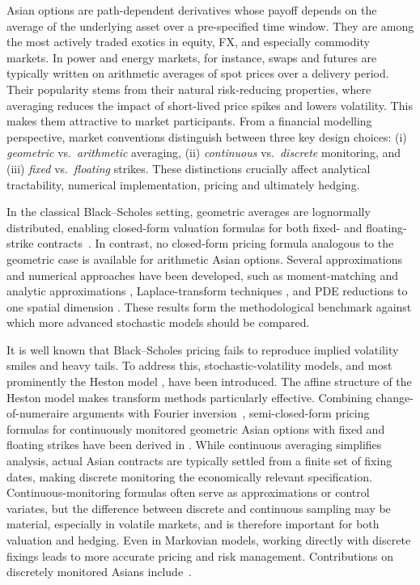 \documentclass[10pt,a4paper,reqno]{amsart}
\theoremstyle{plain}
\theoremstyle{definition}
\theoremstyle{remark}
\theoremstyle{example}
\begin{document}
Asian options are path-dependent derivatives whose payoff depends on the average of the underlying asset over a pre-specified time window. They are among the most actively traded exotics in equity, FX, and especially commodity markets. In power and energy markets, for instance, swaps and futures are typically written on arithmetic averages of spot prices over a delivery period. Their popularity stems from their natural risk-reducing properties, where averaging reduces the impact of short-lived price spikes and lowers volatility. This makes them attractive to market participants. From a financial modelling perspective, market conventions distinguish between three key design choices: (i) \emph{geometric} vs.\ \emph{arithmetic} averaging, (ii) \emph{continuous} vs.\ \emph{discrete}
monitoring, and (iii) \emph{fixed} vs.\ \emph{floating} strikes. These distinctions crucially affect
analytical tractability, numerical implementation, pricing and ultimately hedging. 

In the classical Black--Scholes setting, geometric averages are lognormally distributed, enabling
closed-form valuation formulas for both fixed- and floating-strike contracts~\cite{KemnaVorst1990}. In contrast, no closed-form pricing formula analogous to the geometric case is available for arithmetic Asian options. Several approximations and numerical approaches have been developed, such as moment-matching and analytic approximations \cite{TurnbullWakeman1991}, Laplace-transform techniques \cite{GemanYor1993}, and PDE reductions to one spatial dimension \cite{RogersShi1995,Vecer2001}. These results form the methodological benchmark against which more advanced stochastic models should be compared.

It is well known that Black--Scholes pricing fails to reproduce implied volatility smiles and heavy tails. To address this, stochastic-volatility models, and most prominently the Heston model \cite{Heston1993}, have been introduced. The affine structure of the Heston model makes transform methods particularly effective. Combining change-of-numeraire arguments with Fourier inversion~\cite{GemanKarouiRochet1995,GilPelaez1951}, semi-closed-form pricing formulas for continuously monitored geometric Asian options with fixed and floating strikes have been derived in \cite{KimWee2014}. While continuous averaging simplifies analysis, actual Asian contracts are typically settled from a finite set of fixing dates, making discrete monitoring the economically relevant specification. Continuous-monitoring formulas often serve as approximations or control variates, but the difference between discrete and continuous sampling may be material, especially in volatile markets, and is therefore important for both valuation and hedging. Even in Markovian models, working directly with discrete fixings leads to more accurate pricing and risk management. Contributions on discretely monitored Asians include~\cite{MR3508667, MR3181982}.
\end{document}
